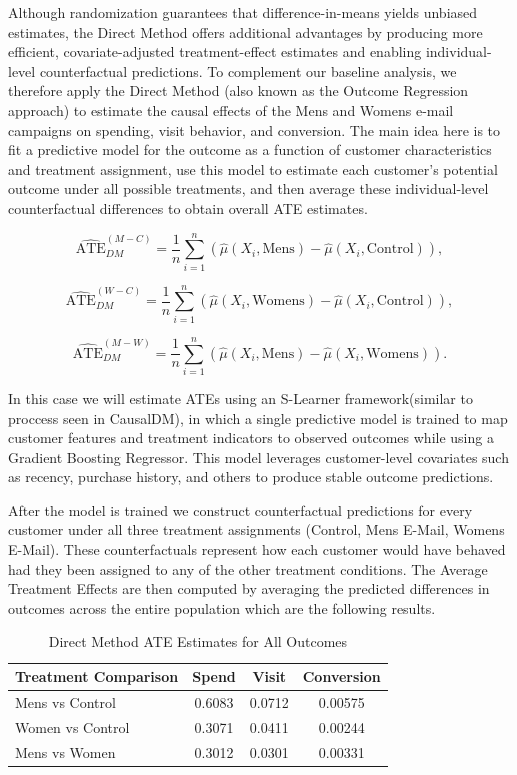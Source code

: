 \documentclass[10pt]{article}
\begin{document}
Although randomization guarantees that difference-in-means yields unbiased estimates, the Direct Method offers additional advantages by producing more efficient, covariate-adjusted treatment-effect estimates and enabling individual-level counterfactual predictions. To complement our baseline analysis, we therefore apply the Direct Method (also known as the Outcome Regression approach) to estimate the causal effects of the Mens and Womens e-mail campaigns on spending, visit behavior, and conversion. The main idea here is to fit a predictive model for the outcome as a function of customer characteristics and treatment assignment, use this model to estimate each customer's potential outcome under all possible treatments, and then average these individual-level counterfactual differences to obtain overall ATE estimates.


\[
\widehat{\mathrm{ATE}}_{DM}^{(M-C)}
=
\frac{1}{n}\sum_{i=1}^n 
\left(
\widehat{\mu}(X_i, \text{Mens})
-
\widehat{\mu}(X_i, \text{Control})
\right),
\]

\[
\widehat{\mathrm{ATE}}_{DM}^{(W-C)}
=
\frac{1}{n}\sum_{i=1}^n 
\left(
\widehat{\mu}(X_i, \text{Womens})
-
\widehat{\mu}(X_i, \text{Control})
\right),
\]

\[
\widehat{\mathrm{ATE}}_{DM}^{(M-W)}
=
\frac{1}{n}\sum_{i=1}^n 
\left(
\widehat{\mu}(X_i, \text{Mens})
-
\widehat{\mu}(X_i, \text{Womens})
\right).
\]

In this case we will estimate ATEs using an S-Learner framework(similar to proccess seen in CausalDM), in which a single predictive model is trained to map customer features and treatment indicators to observed outcomes while using a Gradient Boosting Regressor. This model leverages customer-level covariates such as recency, purchase history, and others to produce stable outcome predictions.

After the model is trained we construct counterfactual predictions for every customer under all three treatment assignments (Control, Mens E-Mail, Womens E-Mail). These counterfactuals represent how each customer would have behaved had they been assigned to any of the other treatment conditions. The Average Treatment Effects are then computed by averaging the predicted differences in outcomes across the entire population which are the following results.

\begin{table}[H]
\centering
\caption{Direct Method ATE Estimates for All Outcomes}
\begin{tabular}{lccc}
\toprule
\textbf{Treatment Comparison} & \textbf{Spend} & \textbf{Visit} & \textbf{Conversion} \\
\midrule
Mens vs Control   & 0.6083 & 0.0712 & 0.00575 \\
Women vs Control  & 0.3071 & 0.0411 & 0.00244 \\
Mens vs Women     & 0.3012 & 0.0301 & 0.00331 \\
\bottomrule
\end{tabular}
\end{table}
\end{document}
